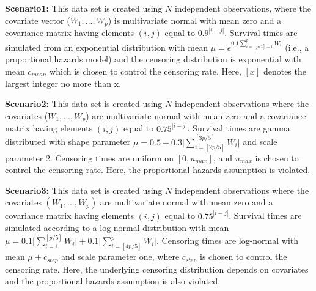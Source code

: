 \begin{sloppypar}

  \noindent \textbf{Scenario1:}
  This data set is created using $N$ independent observations, where the covariate vector ($ W_1, . . . ,W_{p} $) is multivariate normal with mean zero and a covariance matrix having elements $(i, j)$ equal to $0.9^{|i-j|}$. Survival times are simulated from an exponential distribution with mean $ \mu = e^{0.1 \sum_{i=[p/2]+1}^{p}W_i} $ (i.e., a proportional hazards model) and the censoring distribution is exponential with mean $c_{mean}$ which is chosen to control the censoring rate. Here, $[x]$ denotes the largest integer no more than x.

  \noindent \textbf{Scenario2:}
  This data set is created using $N$ independent observations where the covariates ($W_1, . . . ,W_{p}$) are multivariate normal with mean zero and a covariance matrix having elements $(i, j)$ equal to $0.75^{|i-j|}$. Survival times are gamma distributed with shape parameter $\mu = 0.5 + 0.3\lvert\sum_{i=[2p/5]}^{[3p/5]} W_i\rvert $ and scale parameter 2. Censoring times are uniform on $[0, u_{max}]$, and $u_{max}$ is chosen to control the censoring rate. Here, the proportional hazards assumption is violated.

  \noindent \textbf{Scenario3:}
  This data set is created using $N$ independent observations where the covariates $(W_1, . . . ,W_{p})$ are multivariate normal with mean zero and a covariance matrix having elements $(i, j)$ equal to $0.75^{|i-j|}$. Survival times are simulated according to a log-normal distribution with mean $\mu = 0.1\lvert \sum_{i=1}^{[p/5]} W_i\rvert + 0.1\lvert\sum_{i=[4p/5]}^{p}W_i\rvert$. Censoring times are log-normal with mean $ \mu + c_{step} $ and scale parameter one, where $c_{step}$ is chosen to control the censoring rate. Here, the underlying censoring distribution depends on covariates and the proportional hazards assumption is also violated.
  \end{sloppypar}

